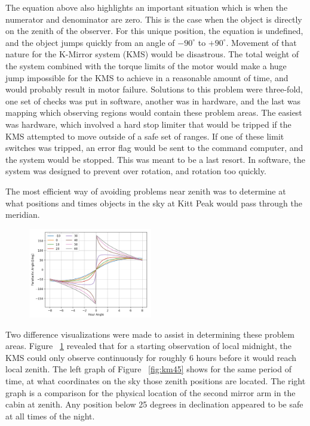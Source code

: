 \documentclass[manuscript]{aastex}
\begin{document}
The equation above also highlights an important situation which is when the numerator and denominator are zero. This is the case when the object is directly on the zenith of the observer. For this unique position, the equation is undefined, and the object jumps quickly from an angle of $- 90^{\circ}$ to $+ 90^{\circ}$. Movement of that nature for the K-Mirror system (KMS) would be disastrous. The total weight of the system combined with the torque limits of the motor would make a huge jump impossible for the KMS to achieve in a reasonable amount of time, and would probably result in motor failure. Solutions to this problem were three-fold, one set of checks was put in software, another was in hardware, and the last was mapping which observing regions would contain these problem areas. The easiest was hardware, which involved a hard stop limiter that would be tripped if the KMS attempted to move outside of a safe set of ranges. If one of these limit switches was tripped, an error flag would be sent to the command computer, and the system would be stopped. This was meant to be a last resort. In software, the system was designed to prevent over rotation, and rotation too quickly.

The most efficient way of avoiding problems near zenith was to determine at what positions and times objects in the sky at Kitt Peak would pass through the meridian. 
\begin{figure}
\vspace{-0.8cm}
  \begin{center}
    \includegraphics[width=0.48\textwidth]{km6.png}
  \end{center}
  \caption[]{}
  \label{fig:km6}
\end{figure}
Two difference visualizations were made to assist in determining these problem areas. Figure ~\ref{fig:km6} revealed that for a starting observation of local midnight, the KMS could only observe continuously for roughly 6 hours before it would reach local zenith. The left graph of Figure ~\ref{fig:km45} shows for the same period of time, at what coordinates on the sky those zenith positions are located. The right graph is a comparison for the physical location of the second mirror arm in the cabin at zenith. Any position below 25 degrees in declination appeared to be safe at all times of the night. 
\end{document}
